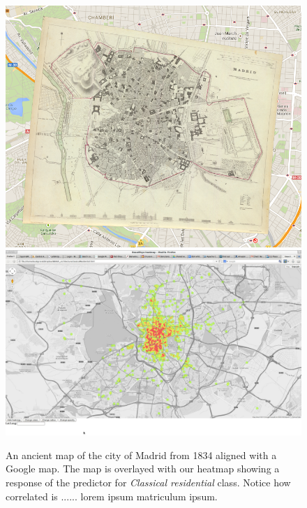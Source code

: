 \documentclass[runningheads, table]{llncs}
\begin{document}
  \begin{figure}
    \centering
    \includegraphics[width=0.9\linewidth]{imgs/map1834.png}\\
    \includegraphics[width=0.9\linewidth,trim= 780 460 740 435, clip=true]{imgs/arch/mapS2.jpg}
    \caption{
      An ancient map of the city of Madrid from 1834 aligned with a Google map. The map is overlayed  with our heatmap showing a response of the predictor for \emph{Classical residential} class. Notice how correlated is ...... lorem ipsum matriculum ipsum.
    }
    \label{fig:map1834}
  \end{figure}





\end{document}

